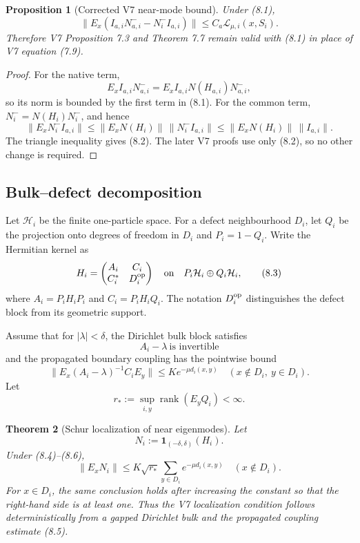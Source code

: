 \documentclass[11pt]{article}
\newtheorem{theorem}{Theorem}[section]
\newtheorem{proposition}[theorem]{Proposition}
\begin{document}
\begin{proposition}[Corrected V7 near-mode bound]
\label{prop:v11v8-correction}
Under (8.1),
\[
 \|E_x(I_{a,i}N_{a,i}^- -N_i^-I_{a,i})\|
 \leq
 C_a\mathcal L_{\mu,i}(x,S_i).
 \tag{8.2}
\]
Therefore V7 Proposition 7.3 and Theorem 7.7 remain valid with (8.1) in
place of V7 equation (7.9).
\end{proposition}

\begin{proof}
For the native term,
\[
 E_xI_{a,i}N_{a,i}^-
 =
 E_xI_{a,i}N(H_{a,i})N_{a,i}^-,
\]
so its norm is bounded by the first term in (8.1).  For the common term,
\(N_i^-=N(H_i)N_i^-\), and hence
\[
 \|E_xN_i^-I_{a,i}\|
 \leq
 \|E_xN(H_i)\|\,\|N_i^-I_{a,i}\|
 \leq
 \|E_xN(H_i)\|\,\|I_{a,i}\|.
\]
The triangle inequality gives (8.2).  The later V7 proofs use only (8.2),
so no other change is required.
\end{proof}

\subsection{Bulk--defect decomposition}

Let \(\mathcal H_i\) be the finite one-particle space.  For a defect
neighbourhood \(D_i\), let \(Q_i\) be the projection onto degrees of
freedom in \(D_i\) and \(P_i=1-Q_i\).  Write the Hermitian kernel as
\[
 H_i=
 \begin{pmatrix}
 A_i&C_i\\
 C_i^*&D_i^{\rm op}
 \end{pmatrix}
 \quad\text{on}\quad
 P_i\mathcal H_i\oplus Q_i\mathcal H_i,
 \tag{8.3}
\]
where \(A_i=P_iH_iP_i\) and \(C_i=P_iH_iQ_i\).
The notation \(D_i^{\rm op}\) distinguishes the defect block from its
geometric support.

Assume that for \(|\lambda|<\delta\), the Dirichlet bulk block satisfies
\[
 A_i-\lambda\ \text{is invertible}
 \tag{8.4}
\]
and the propagated boundary coupling has the pointwise bound
\[
 \|E_x(A_i-\lambda)^{-1}C_iE_y\|
 \leq
 K e^{-\mu d_i(x,y)}
 \quad
 (x\notin D_i,\ y\in D_i).
 \tag{8.5}
\]
Let
\[
 r_*:=\sup_{i,y}\operatorname{rank}(E_yQ_i)<\infty.
 \tag{8.6}
\]

\begin{theorem}[Schur localization of near eigenmodes]
\label{thm:v11v8-schur-localization}
Let
\[
 N_i:=\mathbf1_{(-\delta,\delta)}(H_i).
\]
Under (8.4)--(8.6),
\[
 \|E_xN_i\|
 \leq
 K\sqrt{r_*}
 \sum_{y\in D_i}e^{-\mu d_i(x,y)}
 \quad (x\notin D_i).
 \tag{8.7}
\]
For \(x\in D_i\), the same conclusion holds after increasing the constant
so that the right-hand side is at least one.  Thus the V7 localization
condition follows deterministically from a gapped Dirichlet bulk and the
propagated coupling estimate (8.5).
\end{theorem}
\end{document}
